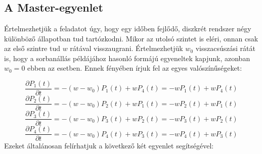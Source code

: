 \section{} \label{sec:2}


\subsection{A Master-egyenlet} \label{sub:2.1}

Értelmezhetjük a feladatot úgy, hogy egy időben fejlődő, diszkrét rendszer négy különböző állapotban tud tartózkodni. Mikor az utolsó szintet is eléri, onnan csak az első szintre tud $w$ rátával visszaugrani. Értelmezhetjük $w_{0}$ visszacsúszási rátát is, hogy a sorbanállás példájához hasonló formájú egyeneltek kapjunk, azonban $w_{0} = 0$ ebben az esetben. Ennek fényében írjuk fel az egyes valószínűségeket:

\begin{equation} \label{eq:4}
    \frac{\partial P_{1} \left( t \right)}{\partial t}
    =
    - \left( w - w_{0} \right) P_{1} \left( t \right) + w P_{4} \left( t \right)
    =
    - w P_{1} \left( t \right) + w P_{4} \left( t \right)
\end{equation}
\begin{equation} \label{eq:5}
    \frac{\partial P_{2} \left( t \right)}{\partial t}
    =
    - \left( w - w_{0} \right) P_{2} \left( t \right) + w P_{1} \left( t \right)
    =
    - w P_{2} \left( t \right) + w P_{1} \left( t \right)
\end{equation}
\begin{equation} \label{eq:6}
    \frac{\partial P_{3} \left( t \right)}{\partial t}
    =
    - \left( w - w_{0} \right) P_{3} \left( t \right) + w P_{2} \left( t \right)
    =
    - w P_{3} \left( t \right) + w P_{2} \left( t \right)
\end{equation}
\begin{equation} \label{eq:7}
    \frac{\partial P_{4} \left( t \right)}{\partial t}
    =
    - \left( w - w_{0} \right) P_{4} \left( t \right) + w P_{3} \left( t \right)
    =
    - w P_{4} \left( t \right) + w P_{3} \left( t \right)
\end{equation}
Ezeket általánosan felírhatjuk a következő két egyenlet segítségével:

